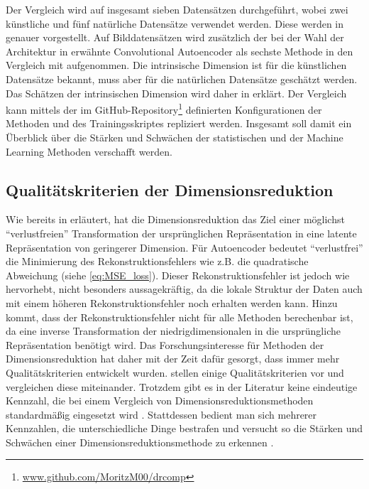 Der Vergleich wird auf insgesamt sieben Datensätzen durchgeführt, wobei zwei künstliche und fünf
natürliche Datensätze verwendet werden. Diese werden in
 genauer vorgestellt. Auf Bilddatensätzen wird
zusätzlich der bei der Wahl der Architektur in  erwähnte
Convolutional Autoencoder als sechste Methode in den Vergleich mit aufgenommen. Die intrinsische
Dimension ist für die künstlichen Datensätze bekannt, muss aber für die natürlichen Datensätze
geschätzt werden. Das Schätzen der intrinsischen Dimension wird daher in
 erklärt. Der Vergleich
kann mittels der im GitHub-Repository\footnote{\url{www.github.com/MoritzM00/drcomp}} definierten
Konfigurationen der Methoden und des Trainingsskriptes repliziert werden. Insgesamt soll damit ein
Überblick über die Stärken und Schwächen der statistischen und der Machine Learning Methoden
verschafft werden.

\subsection{Qualitätskriterien der Dimensionsreduktion}
\label{ch:Vergleich:sec:Methodik:subsec:Qualitaetskriterien}
Wie bereits in  erläutert, hat die Dimensionsreduktion das Ziel einer möglichst \enquote{verlustfreien} Transformation der ursprünglichen Repräsentation in eine latente Repräsentation von geringerer Dimension. Für Autoencoder bedeutet \enquote{verlustfrei} die Minimierung des Rekonstruktionsfehlers wie z.B. die quadratische Abweichung (siehe \eqref{eq:MSE_loss}). Dieser Rekonstruktionsfehler ist jedoch wie \textcite[18]{vanderMaaten.2009} hervorhebt, nicht besonders aussagekräftig, da die lokale Struktur der Daten auch mit einem höheren Rekonstruktionsfehler noch erhalten werden kann. Hinzu kommt, dass der Rekonstruktionsfehler nicht für alle Methoden berechenbar ist, da eine inverse Transformation der niedrigdimensionalen in die ursprüngliche Repräsentation benötigt wird. Das Forschungsinteresse für Methoden der Dimensionsreduktion hat daher mit der Zeit dafür gesorgt, dass immer mehr Qualitätskriterien entwickelt wurden. \textcite{Gracia.2014} stellen einige Qualitätskriterien vor und vergleichen diese miteinander. Trotzdem gibt es in der Literatur keine eindeutige Kennzahl, die bei einem Vergleich von Dimensionsreduktionsmethoden standardmäßig eingesetzt wird \parencite[vgl.][1 -- 2]{Lee.2009}. Stattdessen bedient man sich mehrerer Kennzahlen, die
unterschiedliche Dinge bestrafen und versucht so die Stärken und Schwächen einer
Dimensionsreduktionsmethode zu erkennen \parencite[486]{Venna.2001}.

